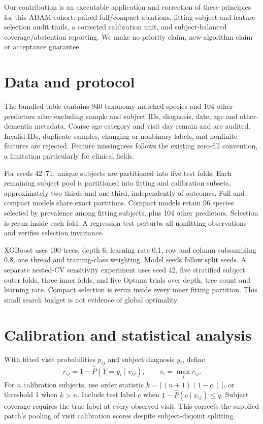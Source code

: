 \documentclass[manuscript,review,anonymous]{acmart}
\begin{document}
Our contribution is an executable application and correction of these principles for this ADAM cohort: paired full/compact ablations, fitting-subject and feature-selection audit trails, a corrected calibration unit, and subject-balanced coverage/abstention reporting. We make no priority claim, new-algorithm claim or acceptance guarantee.

\section{Data and protocol}
The bundled table contains 940 taxonomy-matched species and 104 other predictors after excluding sample and subject IDs, diagnosis, date, age and other-dementia metadata. Coarse age category and visit day remain and are audited. Invalid IDs, duplicate samples, changing or nonbinary labels, and nonfinite features are rejected. Feature missingness follows the existing zero-fill convention, a limitation particularly for clinical fields.

For seeds 42--71, unique subjects are partitioned into five test folds. Each remaining subject pool is partitioned into fitting and calibration subsets, approximately two thirds and one third, independently of outcomes. Full and compact models share exact partitions. Compact models retain 96 species selected by prevalence among fitting subjects, plus 104 other predictors. Selection is rerun inside each fold. A regression test perturbs all nonfitting observations and verifies selection invariance.

XGBoost uses 100 trees, depth 6, learning rate 0.1, row and column subsampling 0.8, one thread and training-class weighting. Model seeds follow split seeds. A separate nested-CV sensitivity experiment uses seed 42, five stratified subject outer folds, three inner folds, and five Optuna trials over depth, tree count and learning rate. Compact selection is rerun inside every inner fitting partition. This small search budget is not evidence of global optimality.

\section{Calibration and statistical analysis}
With fitted visit probabilities $p_{ij}$ and subject diagnosis $y_i$, define
\[
r_{ij}=1-\widehat P(Y=y_i\mid x_{ij}),\qquad s_i=\max_j r_{ij}.
\]
For $n$ calibration subjects, use order statistic $k=\lceil(n+1)(1-\alpha)\rceil$, or threshold 1 when $k>n$. Include test label $c$ when $1-\widehat P(c\mid x_{ij})\leq q$. Subject coverage requires the true label at every observed visit. This corrects the supplied patch's pooling of visit calibration scores despite subject-disjoint splitting.
\end{document}
